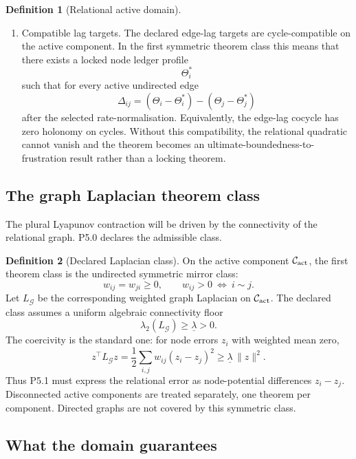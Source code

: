 \documentclass[11pt,a4paper]{article}
\def\emph#1{#1}%
\theoremstyle{definition}
\newtheorem{definition}{Definition}[section]
\theoremstyle{plain}
\theoremstyle{remark}
\begin{document}
\begin{definition}[Relational active domain]
\begin{enumerate}[label=\textup{(\arabic*)},leftmargin=1.2cm]
\item \emph{Compatible lag targets.}
The declared edge-lag targets are cycle-compatible on the active component. In the
first symmetric theorem class this means that there exists a locked node ledger
profile
\[
\Theta_i^*
\]
such that for every active undirected edge
\[
\Delta_{ij}
=
(\Theta_i-\Theta_i^*)-(\Theta_j-\Theta_j^*)
\]
after the selected rate-normalisation. Equivalently, the edge-lag cocycle has zero
holonomy on cycles. Without this compatibility, the relational quadratic cannot
vanish and the theorem becomes an ultimate-boundedness-to-frustration result
rather than a locking theorem.
\end{enumerate}
\end{definition}

\subsection{The graph Laplacian theorem class}

The plural Lyapunov contraction will be driven by the connectivity of the relational graph.
P5.0 declares the admissible class.

\begin{definition}[Declared Laplacian class]\label{def:laplacian}
On the active component \(\mathcal C_{\rm act}\), the first theorem class is the
undirected symmetric mirror class:
\[
w_{ij}=w_{ji}\ge0,
\qquad
w_{ij}>0\ \Longleftrightarrow\ i\sim j.
\]
Let \(L_{\mathcal G}\) be the corresponding weighted graph Laplacian on
\(\mathcal C_{\rm act}\). The declared class assumes a uniform algebraic
connectivity floor
\[
\boxed{\;
\lambda_2(L_{\mathcal G})\ge\underline\lambda>0.
\;}
\]
The coercivity is the standard one: for node errors \(z_i\) with weighted mean zero,
\[
z^\top L_{\mathcal G}z
=
\frac12\sum_{i,j}w_{ij}(z_i-z_j)^2
\ge
\underline\lambda\,\lVert z\rVert^2.
\]
Thus P5.1 must express the relational error as node-potential differences
\(z_i-z_j\). Disconnected active components are treated separately, one theorem
per component. Directed graphs are not covered by this symmetric class.
\end{definition}

\subsection{What the domain guarantees}
\end{document}
